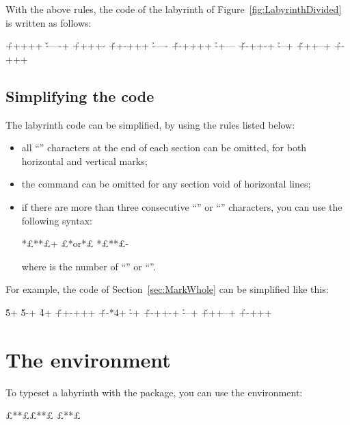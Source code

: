 \documentclass[a4paper,11pt,headinclude,footinclude]{scrartcl}
\def\ins{~}
\begin{document}
With the above rules, the code of the labyrinth of Figure\ins\ref{fig:LabyrinthDivided} is written as follows:
\begin{code}
          \h +++++ %
\v -----+ \h ++++- %
\v ++-+++ \h ----- %
\v +-++++ \h -+--- %
\v +-++-+ \h ---+  %
\v +++--+ \h +-+++ %
\end{code}

\subsection{Simplifying the code}

The labyrinth code can be simplified, by using the rules listed below:
\begin{itemize}
	\item all “\othname{-}” characters at the end of each section can be omitted, for both horizontal and vertical marks;
	\item the  command can be omitted for any section void of horizontal lines;
	\item if there are more than three consecutive “\othname{+}” or “\othname{-}” characters, you can use the following syntax:\othindex{*}
\begin{code}
*{£**£}+ £*\normalfont or*£ *{£**£}-
\end{code}
where  is the number of “\othname{+}” or “\othname{-}”.
\end{itemize}

For example, the code of Section\ins\ref{sec:MarkWhole} can be simplified like this:
\begin{code}
          \h *5+   %
\v *5-+   \h *4+   %
\v ++-+++          %
\v +-*4+  \h -+    %
\v +-++-+ \h ---+  %
\v +++--+ \h +-+++ %
\end{code}

\section{The  environment}

To typeset a labyrinth with the  package, you can use the  environment:

\begin{code}
\begin{labyrinth}{£**£}{£**£}
£**£
\end{labyrinth}
\end{code}
\end{document}
